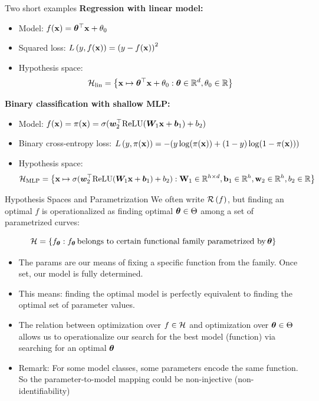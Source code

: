 \documentclass[11pt,compress,t,notes=noshow, xcolor=table]{beamer}
\begin{document}
\begin{vbframe}{Two short examples}
\textbf{Regression with linear model:}\\
\begin{itemize}
    \item Model: $f(\mathbf{x}) = \bm{\theta}^\top \mathbf{x} + \theta_0$
    \item Squared loss:  
    $L\left(y, f(\mathbf{x})\right) = \left(y-f(\mathbf{x})\right)^2$
    \item Hypothesis space: $$\mathcal{H}_{\text{lin}} = \left\{ \mathbf{x} \mapsto \bm{\theta}^\top \mathbf{x} + \theta_0 : \bm{\theta} \in \mathbb{R}^d, \theta_0 \in \mathbb{R} \right\}$$
\end{itemize}

\vspace{0.3cm}

\textbf{Binary classification with shallow MLP:}\\
\begin{itemize}
    \item Model: $f(\mathbf{x}) = \pi(\mathbf{x})= \sigma(\bm{w}_2^{\top} \text{ReLU}(\bm{W}_1 \mathbf{x} + \bm{b}_1) + b_2)$
    \item Binary cross-entropy loss: $L\left(y, \pi(\mathbf{x})\right) = -(y\log(\pi(\mathbf{x}))+(1-y)\log(1-\pi(\mathbf{x})))$\\ 
    \item Hypothesis space: {\small $$\mathcal{H}_{\text{MLP}} = \left\{ \mathbf{x} \mapsto \sigma(\bm{w}_2^{\top} \text{ReLU}(\bm{W}_1 \mathbf{x} + \bm{b}_1) + b_2): \mathbf{W}_1 \in \mathbb{R}^{h \times d}, \mathbf{b}_1 \in \mathbb{R}^h, \mathbf{w}_2 \in \mathbb{R}^h, b_2 \in \mathbb{R} \right\}$$}
\end{itemize}
  
\end{vbframe}

\begin{vbframe}{Hypothesis Spaces and Parametrization}
We often write $\mathcal{R} \left(f\right)$, but finding an optimal $f$ is operationalized as finding optimal $\bm{\theta} \in \Theta$ among a set of parametrized curves:

$$\mathcal{H} = \{f_{\bm{\theta}}: f_{\bm{\theta}}\,\text{belongs to certain functional family parametrized by}\,\bm{\theta}\}$$

\begin{itemize}
    \item The params are our means of fixing a specific function from the family. Once set, our model is fully determined.
    \item This means: finding the optimal model is perfectly equivalent to finding the optimal set of parameter values.
    \item The relation between optimization over $f \in \mathcal{H}$ and optimization
over $\bm{\theta} \in \Theta$ allows us to operationalize our search for the best model (function) via searching for an optimal $\bm{\theta}$
\item Remark: For some model classes, some parameters encode the same function. So the
parameter-to-model mapping could be non-injective (non-identifiability)
\end{itemize}

\end{vbframe}
\end{document}
